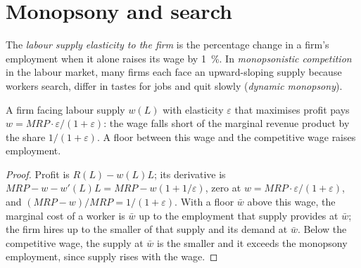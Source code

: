 \section{Monopsony and search}\label{sec:b3:minimum-wage:monopsony}

\begin{definition}\label{def:b3:minimum-wage:monopsonistic}
The \emph{labour supply elasticity to the firm} is the percentage change in a firm's
employment when it alone raises its wage by 1~\%. In \emph{monopsonistic competition}
in the labour market, many firms each face an upward-sloping supply because
workers search, differ in tastes for jobs and quit slowly (\emph{dynamic
monopsony}).
\end{definition}

\begin{proposition}\label{prop:b3:minimum-wage:markdown}
A firm facing labour supply $w(L)$ with elasticity $\varepsilon$ that maximises profit pays $w = \mathit{MRP} \cdot \varepsilon/(1 + \varepsilon)$:
the wage falls short of the marginal revenue product by the share $1/(1 + \varepsilon)$. A floor between
this wage and the competitive wage raises employment.
\end{proposition}

\begin{proof}
Profit is $R(L) - w(L)L$; its derivative is $\mathit{MRP} - w - w'(L)L = \mathit{MRP} - w(1 + 1/\varepsilon)$, zero at $w = \mathit{MRP}\cdot\varepsilon/(1 + \varepsilon)$,
and $(\mathit{MRP} - w)/\mathit{MRP} = 1/(1 + \varepsilon)$. With a floor $\bar w$ above this wage, the marginal cost of a worker is
$\bar w$ up to the employment that supply provides at $\bar w$; the firm hires up to the smaller of that
supply and its demand at $\bar w$. Below the competitive wage, the supply at $\bar w$ is the smaller and
it exceeds the monopsony employment, since supply rises with the wage.
\end{proof}

